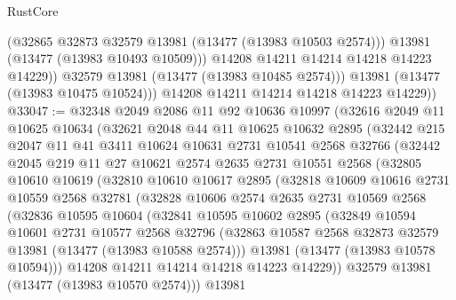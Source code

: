 \begin{lexlean}{RustCore}
\begin{coremodule}
                  (@32865 @32873 @32579 @13981 (@13477 (@13983 @10503 @2574)))
                  @13981
                  (@13477 (@13983 @10493 @10509)))
                @14208
                @14211
                @14214
                @14218
                @14223
                @14229))
            @32579
            @13981
            (@13477 (@13983 @10485 @2574)))
          @13981
          (@13477 (@13983 @10475 @10524)))
        @14208
        @14211
        @14214
        @14218
        @14223
        @14229))
@33047 := @32348
    @2049
    @2086
    @11
    @92
    @10636
    @10997
    (@32616
      @2049
      @11
      @10625
      @10634
      (@32621
        @2048
        @44
        @11
        @10625
        @10632
        @2895
        (@32442
          @215
          @2047
          @11
          @41
          @3411
          @10624
          @10631
          @2731
          @10541
          @2568
          @32766
          (@32442
            @2045
            @219
            @11
            @27
            @10621
            @2574
            @2635
            @2731
            @10551
            @2568
            (@32805
              @10610
              @10619
              (@32810
                @10610
                @10617
                @2895
                (@32818
                  @10609
                  @10616
                  @2731
                  @10559
                  @2568
                  @32781
                  (@32828
                    @10606
                    @2574
                    @2635
                    @2731
                    @10569
                    @2568
                    (@32836
                      @10595
                      @10604
                      (@32841
                        @10595
                        @10602
                        @2895
                        (@32849
                          @10594
                          @10601
                          @2731
                          @10577
                          @2568
                          @32796
                          (@32863 @10587 @2568 @32873 @32579 @13981 (@13477 (@13983 @10588 @2574)))
                          @13981
                          (@13477 (@13983 @10578 @10594)))
                        @14208
                        @14211
                        @14214
                        @14218
                        @14223
                        @14229))
                    @32579
                    @13981
                    (@13477 (@13983 @10570 @2574)))
                  @13981

\end{coremodule}
\end{lexlean}
